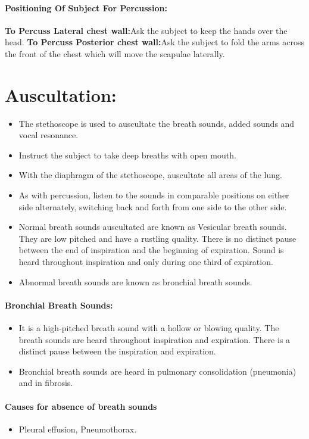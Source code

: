 \documentclass[a4paper,12pt,openany,oneside]{book}
\begin{document}
\paragraph{Positioning Of Subject For Percussion:}
\textbf{To Percuss Lateral chest wall:}Ask the subject to keep the hands over the head.
\textbf{To Percuss Posterior chest wall:}Ask the subject to fold the arms across the front of the chest which will move the scapulae laterally.

\section*{Auscultation:}
\begin{itemize}
\item{The  stethoscope  is  used  to  auscultate  the  breath  sounds,  added  sounds  and  vocal resonance.}
\item{Instruct the subject to take deep breaths with open mouth.}
\item{With the diaphragm of the stethoscope, auscultate all areas of the lung.}
\item{As with percussion, listen to the sounds in comparable positions on either side alternately, switching back and forth from one side to the other side.}
\item{Normal breath sounds auscultated are known as Vesicular breath sounds. They are low pitched and have a rustling quality. There is no distinct pause between the end of inspiration and the beginning of expiration. Sound is heard throughout inspiration and only during one third of expiration.}
\item{Abnormal breath sounds are known as bronchial breath sounds.}
\end{itemize}

\paragraph{Bronchial Breath Sounds:}
\begin{itemize}
\item{It is a high-pitched breath sound with a hollow or blowing quality. The breath sounds are heard throughout inspiration and expiration. There is a distinct pause between the inspiration and expiration.}
\item{Bronchial breath sounds are heard in pulmonary consolidation (pneumonia) and in fibrosis.}
\end{itemize}

\paragraph{Causes for absence of breath sounds}
\begin{itemize}
	\item[]Pleural effusion, Pneumothorax.
\end{itemize}
\end{document}
